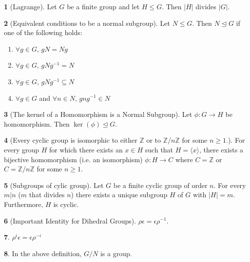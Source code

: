 \documentclass[12pt]{article}
\theoremstyle{definition}
\newtheorem{theorem}{\color{ForestGreen}{\textbf{Theorem}}}
\newcommand{\e}{\epsilon}
\begin{document}
\begin{theorem}[Lagrange]
Let $G$ be a finite group and let $H \leq G$. Then $|H|$ divides $|G|$.
\end{theorem}

\begin{theorem}[Equivalent conditions to be a normal subgroup]
Let $N \leq G$. Then $N \trianglelefteq G$ if one of the following holds:
\begin{enumerate}
\item $\forall g\in G$, $gN = Ng$
\item $\forall g\in G$, $gNg^{-1} = N$
\item $\forall g\in G$, $gNg^{-1} \subseteq N$
\item $\forall g\in G$ and $\forall n\in N$, $gng^{-1} \in N$
\end{enumerate}
\end{theorem}

\begin{theorem}[The kernel of a Homomorphism is a Normal Subgroup]
Let $\phi : G \to H$ be homomorphism. Then $\ker (\phi) \trianglelefteq G$.
\end{theorem}

\begin{theorem}[Every cyclic group is isomorphic to either $\mathbb{Z}$ or to $\mathbb{Z} / n \mathbb{Z}$ for some $n \geq 1$.] For every group $H$ for which there exists an $x \in H$ such that $H = \langle x \rangle$, there exists a bijective homomorphism (i.e. an isomorphism) $\phi : H \to C$ where $C = \mathbb{Z}$ or $C = \mathbb{Z} / n \mathbb{Z}$ for some $n \geq 1$.
\end{theorem}

\begin{theorem}[Subgroups of cylic group]
Let $G$ be a finite cyclic group of order $n$. For every $m | n$ ($m$ that divides $n$) there exists a unique subgroup $H$ of $G$ with $|H|=m$. Furthermore, $H$ is cyclic.
\end{theorem}

\begin{theorem}[Important Identity for Dihedral Groups]
$\rho \e = \e \rho^{-1}$.
\end{theorem}

\begin{theorem}
$\rho^i \e = \e \rho^{-i}$
\end{theorem}

\begin{theorem}
In the above definition, $G/N$ is a group.
\end{theorem}
\end{document}
